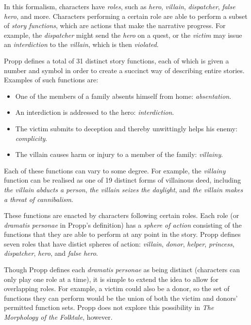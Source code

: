\documentclass[11pt]{report}
\begin{document}
In this formalism, characters have \emph{roles}, such as \emph{hero}, \emph{villain}, \emph{dispatcher}, \emph{false hero}, and more. Characters performing a certain role are able to perform a subset of \emph{story functions}, which are actions that make the narrative progress. For example, the \emph{dispatcher} might send the \emph{hero} on a quest, or the \emph{victim} may issue an \emph{interdiction} to the \emph{villain}, which is then \emph{violated}.

Propp defines a total of 31 distinct story functions, each of which is given a number and symbol in order to create a succinct way of describing entire stories. Examples of such functions are:

\begin{itemize}
  \item One of the members of a family absents himself from home: \emph{absentation}.
  \item An interdiction is addressed to the hero: \emph{interdiction}.
  \item The victim submits to deception and thereby unwittingly helps his enemy: \emph{complicity}.
  \item The villain causes harm or injury to a member of the family: \emph{villainy}.
\end{itemize}

Each of these functions can vary to some degree. For example, the \emph{villainy} function can be realised as one of 19 distinct forms of villainous deed, including \emph{the villain abducts a person}, \emph{the villain seizes the daylight}, and \emph{the villain makes a threat of cannibalism}.

These functions are enacted by characters following certain roles. Each role (or \emph{dramatis personae} in Propp's definition) has a \emph{sphere of action} consisting of the functions that they are able to perform at any point in the story. Propp defines seven roles that have distict spheres of action: \emph{villain}, \emph{donor}, \emph{helper}, \emph{princess}, \emph{dispatcher}, \emph{hero}, and \emph{false hero}.

Though Propp defines each \emph{dramatis personae} as being distinct (characters can only play one role at a time), it is simple to extend the idea to allow for overlapping roles. For example, a victim could also be a donor, so the set of functions they can perform would be the union of both the victim and donors' permitted function sets. Propp does not explore this possibility in \emph{The Morphology of the Folktale}, however.
\end{document}
